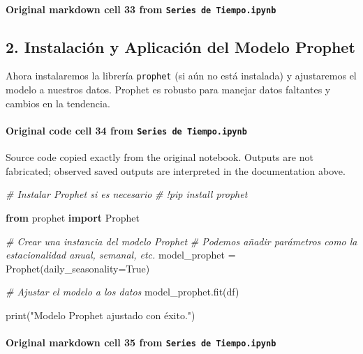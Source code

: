 \documentclass[
  11pt,
]{article}
\newenvironment{Shaded}{}{}
\newcommand{\BuiltInTok}[1]{\textcolor[rgb]{0.00,0.50,0.00}{#1}}
\newcommand{\CommentTok}[1]{\textcolor[rgb]{0.38,0.63,0.69}{\textit{#1}}}
\newcommand{\ImportTok}[1]{\textcolor[rgb]{0.00,0.50,0.00}{\textbf{#1}}}
\newcommand{\NormalTok}[1]{#1}
\newcommand{\OperatorTok}[1]{\textcolor[rgb]{0.40,0.40,0.40}{#1}}
\newcommand{\StringTok}[1]{\textcolor[rgb]{0.25,0.44,0.63}{#1}}
\newcommand{\VariableTok}[1]{\textcolor[rgb]{0.10,0.09,0.49}{#1}}
\begin{document}
\paragraph{\texorpdfstring{Original markdown cell 33 from \texttt{Series\ de\ Tiempo.ipynb}}{Original markdown cell 33 from Series de Tiempo.ipynb}}\label{original-markdown-cell-33-from-series-de-tiempoipynb}

\subsection{2. Instalación y Aplicación del Modelo Prophet}\label{2-instalaciuxf3n-y-aplicaciuxf3n-del-modelo-prophet}

Ahora instalaremos la librería \texttt{prophet} (si aún no está instalada) y ajustaremos el modelo a nuestros datos. Prophet es robusto para manejar datos faltantes y cambios en la tendencia.

\paragraph{\texorpdfstring{Original code cell 34 from \texttt{Series\ de\ Tiempo.ipynb}}{Original code cell 34 from Series de Tiempo.ipynb}}\label{original-code-cell-34-from-series-de-tiempoipynb}

Source code copied exactly from the original notebook. Outputs are not fabricated; observed saved outputs are interpreted in the documentation above.

\begin{Shaded}
\begin{Highlighting}[]
\CommentTok{\# Instalar Prophet si es necesario}
\CommentTok{\# !pip install prophet}

\ImportTok{from}\NormalTok{ prophet }\ImportTok{import}\NormalTok{ Prophet}

\CommentTok{\# Crear una instancia del modelo Prophet}
\CommentTok{\# Podemos añadir parámetros como la estacionalidad anual, semanal, etc.}
\NormalTok{model\_prophet }\OperatorTok{=}\NormalTok{ Prophet(daily\_seasonality}\OperatorTok{=}\VariableTok{True}\NormalTok{)}

\CommentTok{\# Ajustar el modelo a los datos}
\NormalTok{model\_prophet.fit(df)}

\BuiltInTok{print}\NormalTok{(}\StringTok{"Modelo Prophet ajustado con éxito."}\NormalTok{)}
\end{Highlighting}
\end{Shaded}

\paragraph{\texorpdfstring{Original markdown cell 35 from \texttt{Series\ de\ Tiempo.ipynb}}{Original markdown cell 35 from Series de Tiempo.ipynb}}\label{original-markdown-cell-35-from-series-de-tiempoipynb}
\end{document}
